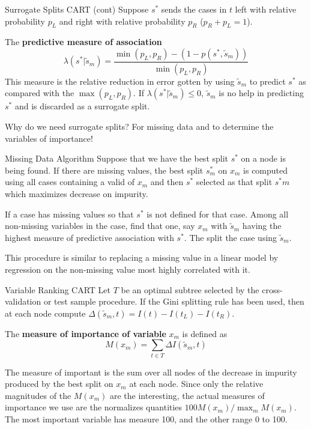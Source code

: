 \documentclass{beamer}
\begin{document}
\begin{frame}{Surrogate Splits CART (cont)}
	Suppose $s^*$ sends the cases in $t$ left with relative probability $p_L$ and right with relative probability $p_R$ ($p_R+p_L=1$).
	
	The \textbf{predictive measure of association} 
	\begin{equation*}
		\lambda(s^*| \tilde{s}_m)= \frac{\min(p_L,p_R)-(1-p(s^*,\tilde{s}_m))}{\min(p_L,p_R)}
	\end{equation*}
	This measure is the relative reduction in error gotten by using $\tilde{s}_m$ to predict $s^*$ as compared with the $\max (p_L,p_R)$. If $\lambda(s^*| \tilde{s}_m)\le 0$, $\tilde{s}_m$ is no help in predicting $s^*$ and is discarded as a surrogate split. 
	
	Why do we need surrogate splits? For missing data and to determine the variables of importance!
	

\end{frame}

\begin{frame}{Missing Data Algorithm}
	Suppose that we have the best split $s^*$ on a node is being found. If there are missing values, the best split $s^*_m$ on $x_m$ is computed using all cases containing a valid of $x_m$ and then $s^*$ selected as that split $s^*m$ which maximizes decrease on impurity.
	
	If a case has missing values so that $s^*$ is not defined for that case. Among all non-missing variables in the case, find that one, say $x_m$ with $\tilde{s}_m$ having the highest measure of predictive association with $s^*$. The split the case using $\tilde{s}_m$.
	
	This procedure is similar to replacing a missing value in a linear model by regression on the non-missing value most highly correlated with it. 
	
\end{frame}

\begin{frame}{Variable Ranking CART}
	Let $T$ be an optimal subtree selected by the cross-validation or test sample procedure. If the Gini splitting rule has been used, then at each node compute $\Delta(\tilde{s}_m,t)= I(t)-I(t_L)-I(t_R)$.
	
	The \textbf{measure of importance of variable} $x_m$ is defined as
	\begin{equation*}
		M(x_m)= \sum_{t\in T} \Delta I (\tilde{s}_m, t)
	\end{equation*}

	The measure of important is the sum over all nodes of the decrease in impurity produced by the best split on $x_m$ at each node. Since only the relative magnitudes of the $M(x_m)$ are the interesting, the actual measures of importance we use are the normalizes quantities $100 M(x_m)/\max_m M(x_m)$. The most important variable has measure 100, and the other range 0 to 100.
\end{frame}
\end{document}
